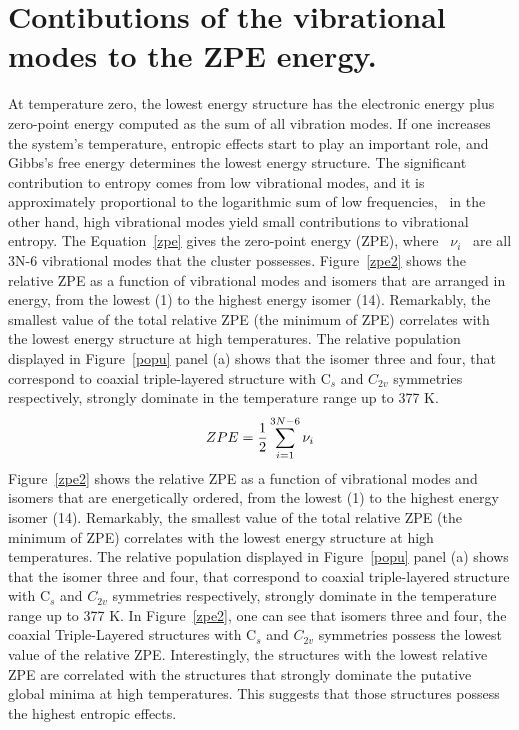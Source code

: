 \documentclass[prb,aps,preprint,showkeys,showpacs]{revtex4}
\begin{document}
 \section{Contibutions of the vibrational modes to the ZPE energy.}
 At temperature zero, the lowest energy structure has the electronic energy plus zero-point energy computed as the sum of all vibration modes.  If one increases the system's temperature, entropic effects start to play an important role, and Gibbs's free energy determines the lowest energy structure. The significant contribution to entropy comes from low vibrational modes, and it is approximately proportional to the logarithmic sum of low frequencies,~\cite{spickermann2011entropies} in the other hand, high vibrational modes yield small contributions to vibrational entropy. The Equation~\ref{zpe} gives the zero-point energy (ZPE), where ~$\nu_i$~ are all 3N-6 vibrational modes that the cluster possesses. Figure~\ref{zpe2} shows the relative ZPE as a function of vibrational modes and isomers that are arranged in energy, from the lowest (1) to the highest energy isomer (14).  Remarkably,   the smallest value of the total relative ZPE (the minimum of ZPE) correlates with the lowest energy structure at high temperatures. The relative population displayed in Figure~\ref{popu} panel (a) shows that the isomer three and four, that correspond to coaxial triple-layered structure with C$_s$  and $C_{2v}$ symmetries respectively, strongly dominate in the temperature range up to 377 K.
 \begin{equation}
  \displaystyle
  \centering 
ZPE=\frac{1}{2}\sum_{i=1}^{3N-6} \nu_i
\label{zpe}
 \end{equation}
Figure~\ref{zpe2} shows the relative ZPE as a function of vibrational modes and isomers that are energetically ordered,  from the lowest (1) to the highest energy isomer (14).  Remarkably,   the smallest value of the total relative ZPE (the minimum of ZPE) correlates with the lowest energy structure at high temperatures. The relative population displayed in Figure~\ref{popu} panel (a) shows that the isomer three and four, that correspond to coaxial triple-layered structure with C$_s$  and $C_{2v}$ symmetries respectively, strongly dominate in the temperature range up to 377 K. In Figure~\ref{zpe2}, one can see that isomers three and four, the coaxial Triple-Layered structures with C$_s$  and $C_{2v}$ symmetries possess the lowest value of the relative ZPE. Interestingly, the structures with the lowest relative ZPE are correlated with the structures that strongly dominate the putative global minima at high temperatures.  This suggests that those structures possess the highest entropic effects. 
\end{document}
